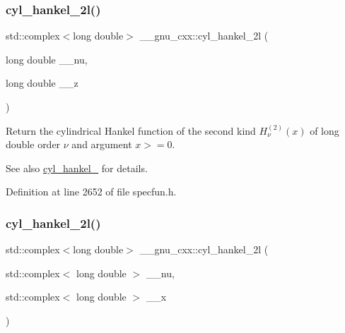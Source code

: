 \subsubsection{\texorpdfstring{cyl\+\_\+hankel\+\_\+2l()}{cyl\_hankel\_2l()}\hspace{0.1cm}{\footnotesize\ttfamily [1/2]}}
{\footnotesize\ttfamily std\+::complex$<$long double$>$ \+\_\+\+\_\+gnu\+\_\+cxx\+::cyl\+\_\+hankel\+\_\+2l (\begin{DoxyParamCaption}\item[{long double}]{\+\_\+\+\_\+nu,  }\item[{long double}]{\+\_\+\+\_\+z }\end{DoxyParamCaption})\hspace{0.3cm}{\ttfamily [inline]}}

Return the cylindrical Hankel function of the second kind $ H^{(2)}_\nu(x) $ of {\ttfamily long double} order $ \nu $ and argument $ x >= 0 $.

\begin{DoxySeeAlso}{See also}
\hyperlink{group__gnu__math__spec__func_ga7ebc71dd48ac97255d72f5f5f43dfd8e}{cyl\+\_\+hankel\+\_} for details. 
\end{DoxySeeAlso}


Definition at line 2652 of file specfun.\+h.

\mbox{\label{group__gnu__math__spec__func_ga1ac6434925254bd02e108f5a4e52b34d}} 
\subsubsection{\texorpdfstring{cyl\+\_\+hankel\+\_\+2l()}{cyl\_hankel\_2l()}\hspace{0.1cm}{\footnotesize\ttfamily [2/2]}}
{\footnotesize\ttfamily std\+::complex$<$long double$>$ \+\_\+\+\_\+gnu\+\_\+cxx\+::cyl\+\_\+hankel\+\_\+2l (\begin{DoxyParamCaption}\item[{std\+::complex$<$ long double $>$}]{\+\_\+\+\_\+nu,  }\item[{std\+::complex$<$ long double $>$}]{\+\_\+\+\_\+x }\end{DoxyParamCaption})\hspace{0.3cm}{\ttfamily [inline]}}

